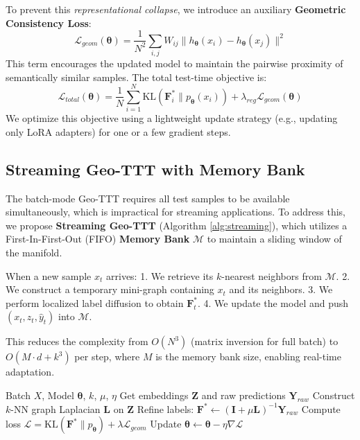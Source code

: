 \documentclass{article}
\theoremstyle{plain}
\theoremstyle{definition}
\theoremstyle{remark}
\newcommand{\Lap}{\mathbf{L}}      %
\newcommand{\F}{\mathbf{F}}        %
\newcommand{\Y}{\mathbf{Y}}        %
\newcommand{\ThetaParam}{\boldsymbol{\theta}}
\newcommand{\Emb}{\mathbf{Z}}      %
\newcommand{\loss}{\mathcal{L}}
\begin{document}
To prevent this \textit{representational collapse}, we introduce an auxiliary \textbf{Geometric Consistency Loss}:
\begin{equation}
    \loss_{geom}(\ThetaParam) = \frac{1}{N^2} \sum_{i,j} W_{ij} \|h_{\ThetaParam}(x_i) - h_{\ThetaParam}(x_j)\|^2
\end{equation}
This term encourages the updated model to maintain the pairwise proximity of semantically similar samples. The total test-time objective is:
\begin{equation}
    \loss_{total}(\ThetaParam) = \frac{1}{N} \sum_{i=1}^N \text{KL}(\F^*_i \| p_{\ThetaParam}(x_i)) + \lambda_{reg} \loss_{geom}(\ThetaParam)
\end{equation}
We optimize this objective using a lightweight update strategy (e.g., updating only LoRA adapters) for one or a few gradient steps.

\subsection{Streaming Geo-TTT with Memory Bank}
The batch-mode Geo-TTT requires all test samples to be available simultaneously, which is impractical for streaming applications. To address this, we propose \textbf{Streaming Geo-TTT} (Algorithm \ref{alg:streaming}), which utilizes a First-In-First-Out (FIFO) \textbf{Memory Bank} $\mathcal{M}$ to maintain a sliding window of the manifold.

When a new sample $x_t$ arrives:
1. We retrieve its $k$-nearest neighbors from $\mathcal{M}$.
2. We construct a temporary mini-graph containing $x_t$ and its neighbors.
3. We perform localized label diffusion to obtain $\F^*_t$.
4. We update the model and push $(x_t, z_t, \hat{y}_t)$ into $\mathcal{M}$.

This reduces the complexity from $O(N^3)$ (matrix inversion for full batch) to $O(M \cdot d + k^3)$ per step, where $M$ is the memory bank size, enabling real-time adaptation.

\begin{algorithm}[tb]
   \caption{Geo-TTT (Batch Mode)}
   \label{alg:geo_ttt_batch}
\begin{algorithmic}[1]
    Batch $X$, Model $\ThetaParam$, $k$, $\mu$, $\eta$
   \STATE Get embeddings $\Emb$ and raw predictions $\Y_{raw}$
   \STATE Construct $k$-NN graph Laplacian $\Lap$ on $\Emb$
   \STATE Refine labels: $\F^* \leftarrow (\mathbf{I} + \mu \Lap)^{-1} \Y_{raw}$
   \STATE Compute loss $\mathcal{L} = \text{KL}(\F^* \| p_{\ThetaParam}) + \lambda \mathcal{L}_{geom}$
   \STATE Update $\ThetaParam \leftarrow \ThetaParam - \eta \nabla \mathcal{L}$
\end{algorithmic}
\end{algorithm}
\end{document}
